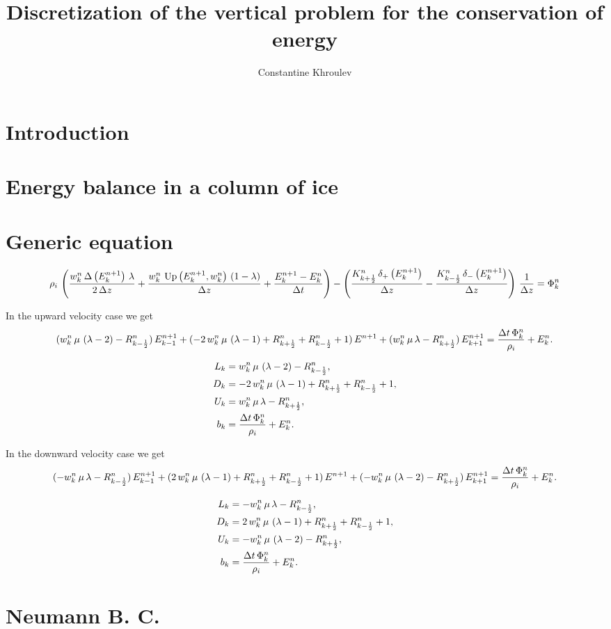\documentclass{article}
\begin{document}
\title{Discretization of the vertical problem for the conservation of energy}
\author{Constantine Khroulev}

\maketitle

\section{Introduction}
\label{sec:introduction}

\section{Energy balance in a column of ice}
\label{sec:energy-in-a-column}

\section{Generic equation}
\label{sec:generic-equation}

\begin{equation}
  \label{eq:1}
  \discretization
\end{equation}

In the upward velocity case we get
\begin{equation}
  \label{eq:2}
  (\Lp)\, \El + (\Dp)\, \E + (\Up)\, \Eu = \Bp.
\end{equation}

\begin{align*}
  L_{k} &= w^{n}_{k}\,\mu\,\left(\lambda-2\right)-R^{n}_{k-\frac{1}{2}},\\
  D_{k} &= -2\,w^{n}_{k}\,\mu\,\left(\lambda-1\right)+R^{n}_{k+\frac{1}{2}}+R^{n}_{k-\frac{1}{2}}+1,\\
  U_{k} &= w^{n}_{k}\,\mu\,\lambda-R^{n}_{k+\frac{1}{2}},\\
  b_{k} &= \frac{\Delta t\,\Phi^{n}_{k}}{\rho_{i}}+E^{n}_{k}.
\end{align*}

In the downward velocity case we get
\begin{equation}
  \label{eq:2}
  (\Lm)\, \El + (\Dm)\, \E + (\Um)\, \Eu = \Bm.
\end{equation}

\begin{align*}
  L_{k} &= -w^{n}_{k}\,\mu\,\lambda-R^{n}_{k-\frac{1}{2}},\\
  D_{k} &= 2\,w^{n}_{k}\,\mu\,\left(\lambda-1\right)+R^{n}_{k+\frac{1}{2}}+R^{n}_{k-\frac{1}{2}}+1,\\
  U_{k} &= -w^{n}_{k}\,\mu\,\left(\lambda-2\right)-R^{n}_{k+\frac{1}{2}},\\
  b_{k} &= \frac{\Delta t\,\Phi^{n}_{k}}{\rho_{i}}+E^{n}_{k}.
\end{align*}

\section{Neumann B. C.}
\label{sec:neumann-b-c}
\end{document}
